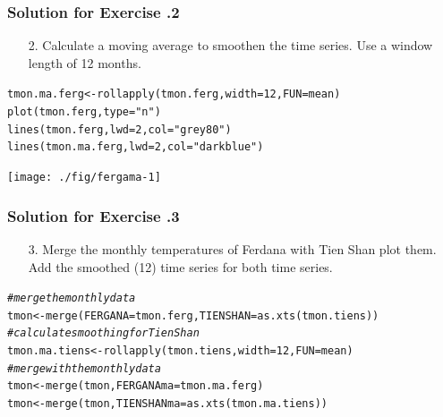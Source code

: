 \documentclass[xcolor=table, xcolor=dvipsnames]{beamer}\usepackage[]{graphicx}\usepackage[]{color}
\makeatletter
\newcommand{\hlnum}[1]{\textcolor[rgb]{0,0,0}{#1}}
\newcommand{\hlstr}[1]{\textcolor[rgb]{0.545,0.137,0.137}{#1}}
\newcommand{\hlcom}[1]{\textcolor[rgb]{0,0.392,0}{\textit{#1}}}
\newcommand{\hlstd}[1]{\textcolor[rgb]{0,0,0}{#1}}
\newcommand{\hlkwb}[1]{\textcolor[rgb]{0,0,0}{#1}}
\newcommand{\hlkwc}[1]{\textcolor[rgb]{1,0,1}{#1}}
\newcommand{\hlkwd}[1]{\textcolor[rgb]{0,0,1}{#1}}
\newenvironment{kframe}{%
 \def\at@end@of@kframe{}%
 \ifinner\ifhmode%
  \def\at@end@of@kframe{\end{minipage}}%
  \begin{minipage}{\columnwidth}%
 \fi\fi%
 \def\FrameCommand##1{\hskip\@totalleftmargin \hskip-\fboxsep
 \colorbox{shadecolor}{##1}\hskip-\fboxsep
     \hskip-\linewidth \hskip-\@totalleftmargin \hskip\columnwidth}%
 \MakeFramed {\advance\hsize-\width
   \@totalleftmargin\z@ \linewidth\hsize
   \@setminipage}}%
 {\par\unskip\endMakeFramed%
 \at@end@of@kframe}
\newenvironment{knitrout}{}{} %
\newcounter{exercisecount}
\makeatother
\begin{document}

\begin{frame}[fragile]\frametitle{Solution for Exercise .2}
  \begin{enumerate}
  \item[2.] Calculate a moving average to smoothen the time series. Use a window length of 12 months.
  \end{enumerate}
\begin{knitrout}
\color{fgcolor}\begin{kframe}
\begin{alltt}
\hlstd{tmon.ma.ferg} \hlkwb{<-} \hlkwd{rollapply}\hlstd{(tmon.ferg,} \hlkwc{width}\hlstd{=}\hlnum{12}\hlstd{,} \hlkwc{FUN}\hlstd{=mean)}
\hlkwd{plot}\hlstd{(tmon.ferg,} \hlkwc{type}\hlstd{=}\hlstr{"n"}\hlstd{)}
\hlkwd{lines}\hlstd{(tmon.ferg,} \hlkwc{lwd}\hlstd{=}\hlnum{2}\hlstd{,} \hlkwc{col}\hlstd{=}\hlstr{"grey80"}\hlstd{)}
\hlkwd{lines}\hlstd{(tmon.ma.ferg,} \hlkwc{lwd}\hlstd{=}\hlnum{2}\hlstd{,} \hlkwc{col}\hlstd{=}\hlstr{"darkblue"}\hlstd{)}
\end{alltt}
\end{kframe}

{\centering \texttt{[image: ./fig/fergama-1]} 

}



\end{knitrout}
\end{frame}


\begin{frame}[fragile]\frametitle{Solution for Exercise .3}
  \begin{enumerate}
  \item[3.] Merge the monthly temperatures of Ferdana with Tien Shan plot them. Add the smoothed (12) time series for both time series.
  \end{enumerate}
\begin{knitrout}\small
{}\color{fgcolor}\begin{kframe}
\begin{alltt}
\hlcom{# merge the monthly data}
\hlstd{tmon} \hlkwb{<-} \hlkwd{merge}\hlstd{(}\hlkwc{FERGANA}\hlstd{=tmon.ferg,} \hlkwc{TIENSHAN}\hlstd{=}\hlkwd{as.xts}\hlstd{(tmon.tiens))}
\hlcom{# calculate smoothing for Tien Shan}
\hlstd{tmon.ma.tiens} \hlkwb{<-} \hlkwd{rollapply}\hlstd{(tmon.tiens,} \hlkwc{width}\hlstd{=}\hlnum{12}\hlstd{,} \hlkwc{FUN}\hlstd{=mean)}
\hlcom{# merge with the monthly data}
\hlstd{tmon} \hlkwb{<-} \hlkwd{merge}\hlstd{(tmon,} \hlkwc{FERGANAma}\hlstd{=tmon.ma.ferg)}
\hlstd{tmon} \hlkwb{<-} \hlkwd{merge}\hlstd{(tmon,} \hlkwc{TIENSHANma}\hlstd{=}\hlkwd{as.xts}\hlstd{(tmon.ma.tiens))}
\end{alltt}
\end{kframe}
\end{knitrout}
\end{frame}
\end{document}
